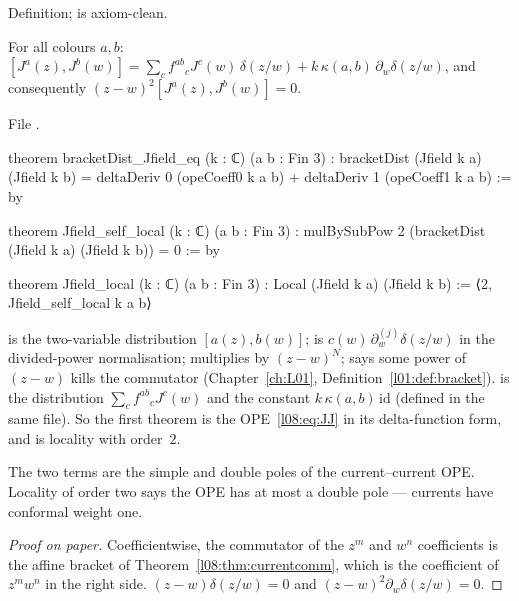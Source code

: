 \begin{status}
Definition;  is axiom-clean.
\end{status}

\begin{theorem}\label{l08:thm:Jlocal}
For all colours $a,b$:
$[J^a(z),J^b(w)] = \sum_cf^{ab}{}_cJ^c(w)\,\delta(z/w) + k\,\kappa(a,b)\,\partial_w\delta(z/w)$,
and consequently $(z-w)^2[J^a(z),J^b(w)] = 0$.
\end{theorem}

\noindent File .
\begin{leancode}
theorem bracketDist_Jfield_eq (k : ℂ) (a b : Fin 3) :
    bracketDist (Jfield k a) (Jfield k b)
      = deltaDeriv 0 (opeCoeff0 k a b) + deltaDeriv 1 (opeCoeff1 k a b) := by

theorem Jfield_self_local (k : ℂ) (a b : Fin 3) :
    mulBySubPow 2 (bracketDist (Jfield k a) (Jfield k b)) = 0 := by

theorem Jfield_local (k : ℂ) (a b : Fin 3) : Local (Jfield k a) (Jfield k b) :=
  ⟨2, Jfield_self_local k a b⟩
\end{leancode}

\begin{dictionary}
 is the two-variable distribution $[a(z),b(w)]$;  is
$c(w)\,\partial_w^{(j)}\delta(z/w)$ in the divided-power normalisation;  multiplies
by $(z-w)^N$;  says some power of $(z-w)$ kills the commutator
(Chapter~\ref{ch:L01}, Definition~\ref{l01:def:bracket}).
 is the distribution $\sum_cf^{ab}{}_cJ^c(w)$ and  the
constant $k\,\kappa(a,b)\,\mathrm{id}$ (defined in the same file). So the first theorem is the
OPE~\eqref{l08:eq:JJ} in its delta-function form, and  is locality with order~$2$.
\end{dictionary}

\begin{physics}
The two terms are the simple and double poles of the current--current OPE. Locality of order two
says the OPE has at most a double pole --- currents have conformal weight one.
\end{physics}

\begin{proof}[Proof on paper]
Coefficientwise, the commutator of the $z^m$ and $w^n$ coefficients is the affine bracket of
Theorem~\ref{l08:thm:currentcomm}, which is the coefficient of $z^mw^n$ in the right side.
$(z-w)\delta(z/w)=0$ and $(z-w)^2\partial_w\delta(z/w)=0$.
\end{proof}

